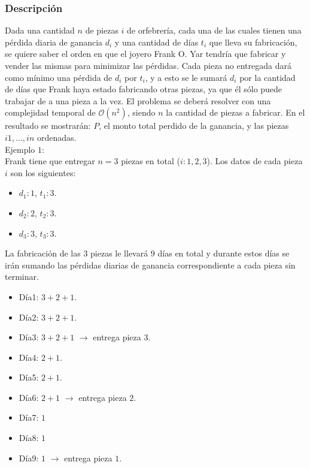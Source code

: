 \documentclass[11pt, a4paper, twoside]{article}
\begin{document}
{}

\subsubsection{Descripción}

Dada una cantidad $n$ de piezas $i$ de orfebrer\'ia, cada una de las cuales tienen una p\'erdida diaria de ganancia $d_i$ y una cantidad de d\'ias $t_i$ que lleva su fabricaci\'on, se quiere saber el orden en que el joyero Frank O. Yar tendr\'ia que fabricar y vender las mismas para minimizar las p\'erdidas. Cada pieza no entregada dar\'a como m\'inimo una p\'erdida de $d_i$ por $t_i$, y a esto se le sumar\'a $d_i$ por la cantidad de d\'ias que Frank haya estado fabricando otras piezas, ya que \'el s\'olo puede trabajar de a una pieza a la vez. El problema se deber\'a resolver con una complejidad temporal de $\mathcal{O}(n^{2})$, siendo $n$ la cantidad de piezas a fabricar. En el resultado se mostrar\'an: $P$, el monto total perdido de la ganancia, y las piezas $i1,...,in$ ordenadas. \\

Ejemplo $1$: \\

Frank tiene que entregar $n=3$ piezas en total ($i:1,2,3$). Los datos de cada pieza $i$ son los siguientes: 

\begin{itemize}
\item $d_1:1$, $t_1:3$. 
\item $d_2:2$, $t_2:3$. 
\item $d_3:3$, $t_3:3$.
\end{itemize}  
    
La fabricaci\'on de las $3$ piezas le llevar\'a $9$ d\'ias en total y durante estos d\'ias se ir\'an sumando las p\'erdidas diarias de ganancia correspondiente a cada pieza sin terminar. 

\begin{itemize}
\item D\'ia1: $3+2+1$. 
\item D\'ia2: $3+2+1$. 
\item D\'ia3: $3+2+1$ $\rightarrow$ entrega pieza $3$.
\item D\'ia4: $2+1$.
\item D\'ia5: $2+1$. 
\item D\'ia6: $2+1$ $\rightarrow$ entrega pieza $2$.
\item D\'ia7: $1$
\item D\'ia8: $1$
\item D\'ia9: $1$ $\rightarrow$ entrega pieza $1$.
\end{itemize}  	
	
\end{document}
